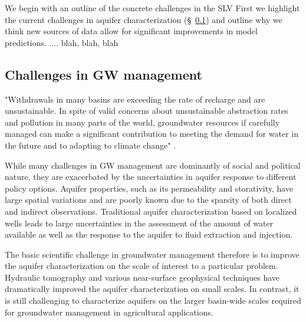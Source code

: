 \documentclass[11pt,final]{article}%
\begin{document}
We begin with an outline of the concrete challenges in the SLV 
First we highlight the current challenges in aquifer characterization (\S~\ref{sec:aquifer characterization}) and outline why we think new sources of data allow for significant improvements in model predictions. .... blah, blah, blah

\subsection{Challenges in GW management}\label{sec:aquifer characterization}

"Withdrawals in many basins are exceeding the rate of recharge and are unsustainable.
In spite of valid concerns about unsustainable abstraction rates and pollution in many parts of the world, groundwater resources if carefully managed can make a significant contribution to meeting the demand for water in the future and to adapting to climate change" \cite{UNESCO2012}.

While many challenges in GW management are dominantly of social and political nature, they are exacerbated by the uncertainties in aquifer response to different policy options. Aquifer properties, such as its permeability and storativity, have large spatial variations and are poorly  known due to the sparsity of both direct and indirect observations. Traditional aquifer characterization based on localized wells leads to large uncertainties in the assessment of the amount of water available as well as the response to the aquifer to fluid extraction and injection. 

The basic scientific challenge in groundwater management therefore is to improve the aquifer characterization on the scale of interest to a particular problem. Hydraulic tomography and various near-surface geophysical techniques have dramatically improved the aquifer characterization on small scales. In contrast, it is still challenging to characterize aquifers on the larger basin-wide scales required for groundwater management in agricultural applications. 
\end{document}
